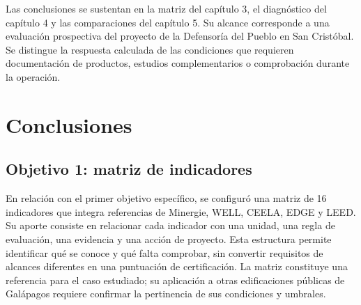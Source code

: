 \label{cap:conclusiones}
\begin{textoDosTercios}
Las conclusiones se sustentan en la matriz del capítulo 3, el diagnóstico del capítulo 4 y las comparaciones del capítulo 5. Su alcance corresponde a una evaluación prospectiva del proyecto de la Defensoría del Pueblo en San Cristóbal. Se distingue la respuesta calculada de las condiciones que requieren documentación de productos, estudios complementarios o comprobación durante la operación.
\end{textoDosTercios}

\section{Conclusiones}
\subsection{Objetivo 1: matriz de indicadores}
\begin{textoDosTercios}
En relación con el primer objetivo específico, se configuró una matriz de 16 indicadores que integra referencias de Minergie, WELL, CEELA, EDGE y LEED. Su aporte consiste en relacionar cada indicador con una unidad, una regla de evaluación, una evidencia y una acción de proyecto. Esta estructura permite identificar qué se conoce y qué falta comprobar, sin convertir requisitos de alcances diferentes en una puntuación de certificación. La matriz constituye una referencia para el caso estudiado; su aplicación a otras edificaciones públicas de Galápagos requiere confirmar la pertinencia de sus condiciones y umbrales.

\end{textoDosTercios}
